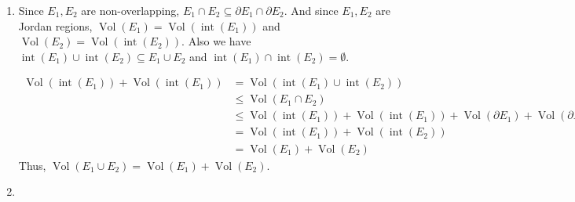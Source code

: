 \documentclass[12pt]{article}
\DeclareMathOperator{\volume}{Vol}
\DeclareMathOperator{\interior}{int}
\newcommand{\boundary}{\partial}
\begin{document}
\begin{enumerate}
\begin{enumerate}
        \item Since $E_1, E_2$ are non-overlapping, $E_1 \cap E_2 \subseteq \boundary E_1 \cap \boundary E_2$.
        And since $E_1, E_2$ are Jordan regions, $\volume(E_1) = \volume(\interior(E_1))$ and $\volume(E_2) = \volume(\interior(E_2))$.
        Also we have $\interior(E_1) \cup \interior(E_2) \subseteq E_1 \cup E_2$ and $\interior(E_1) \cap \interior(E_2) = \emptyset$.

        \begin{align*}
            \volume(\interior(E_1)) + \volume(\interior(E_1)) &= \volume(\interior(E_1) \cup \interior(E_2))\\
            &\leq \volume(E_1 \cap E_2)\\
            &\leq \volume(\interior(E_1)) + \volume(\interior(E_1)) + \volume(\boundary E_1) + \volume(\boundary E_2)\\
            &= \volume(\interior(E_1)) + \volume(\interior(E_2))\\
            &= \volume(E_1) + \volume(E_2)
        \end{align*}
        Thus, $\volume(E_1\cup E_2) = \volume(E_1) + \volume(E_2)$.

        \item 
    \end{enumerate}
\end{enumerate}
\end{document}
